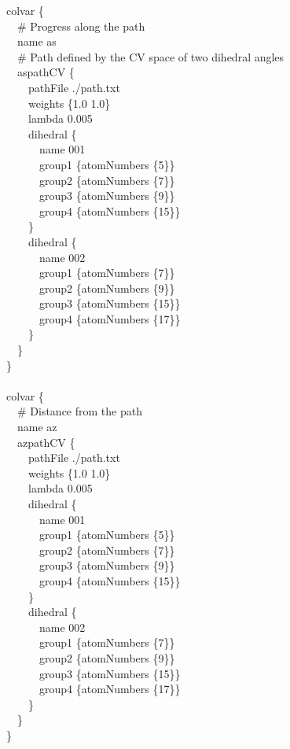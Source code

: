 \begin{cvexampleinput}
colvar \{\\
\-~~\# Progress along the path\\
\-~~name as\\
\-~~\# Path defined by the CV space of two dihedral angles\\
\-~~aspathCV \{\\
\-~~~~pathFile ./path.txt\\
\-~~~~weights \{1.0 1.0\}\\
\-~~~~lambda 0.005\\
\-~~~~dihedral \{\\
\-~~~~~~name 001\\
\-~~~~~~group1 \{atomNumbers \{5\}\}\\
\-~~~~~~group2 \{atomNumbers \{7\}\}\\
\-~~~~~~group3 \{atomNumbers \{9\}\}\\
\-~~~~~~group4 \{atomNumbers \{15\}\}\\
\-~~~~\}\\
\-~~~~dihedral \{\\
\-~~~~~~name 002\\
\-~~~~~~group1 \{atomNumbers \{7\}\}\\
\-~~~~~~group2 \{atomNumbers \{9\}\}\\
\-~~~~~~group3 \{atomNumbers \{15\}\}\\
\-~~~~~~group4 \{atomNumbers \{17\}\}\\
\-~~~~\}\\
\-~~\}\\
\}\\
\\
colvar \{\\
\-~~\# Distance from the path\\
\-~~name az\\
\-~~azpathCV \{\\
\-~~~~pathFile ./path.txt\\
\-~~~~weights \{1.0 1.0\}\\
\-~~~~lambda 0.005\\
\-~~~~dihedral \{\\
\-~~~~~~name 001\\
\-~~~~~~group1 \{atomNumbers \{5\}\}\\
\-~~~~~~group2 \{atomNumbers \{7\}\}\\
\-~~~~~~group3 \{atomNumbers \{9\}\}\\
\-~~~~~~group4 \{atomNumbers \{15\}\}\\
\-~~~~\}\\
\-~~~~dihedral \{\\
\-~~~~~~name 002\\
\-~~~~~~group1 \{atomNumbers \{7\}\}\\
\-~~~~~~group2 \{atomNumbers \{9\}\}\\
\-~~~~~~group3 \{atomNumbers \{15\}\}\\
\-~~~~~~group4 \{atomNumbers \{17\}\}\\
\-~~~~\}\\
\-~~\}\\
\}
\end{cvexampleinput}


